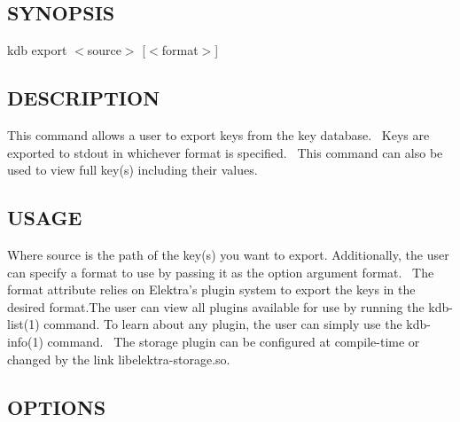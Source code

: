 \subsection*{S\+Y\+N\+O\+P\+S\+IS}

{\ttfamily kdb export $<$source$>$ \mbox{[}$<$format$>$\mbox{]}}~\newline


\subsection*{D\+E\+S\+C\+R\+I\+P\+T\+I\+ON}

This command allows a user to export keys from the key database.~\newline
 Keys are exported to {\ttfamily stdout} in whichever format is specified.~\newline
 This command can also be used to view full key(s) including their values.~\newline


\subsection*{U\+S\+A\+GE}

Where {\ttfamily source} is the path of the key(s) you want to export. Additionally, the user can specify a format to use by passing it as the option argument {\ttfamily format}.~\newline
 The {\ttfamily format} attribute relies on Elektra’s plugin system to export the keys in the desired format.\+The user can view all plugins available for use by running the kdb-\/list(1) command. To learn about any plugin, the user can simply use the kdb-\/info(1) command.~\newline
 The {\ttfamily storage} plugin can be configured at compile-\/time or changed by the link {\ttfamily libelektra-\/storage.\+so}.

\subsection*{O\+P\+T\+I\+O\+NS}


